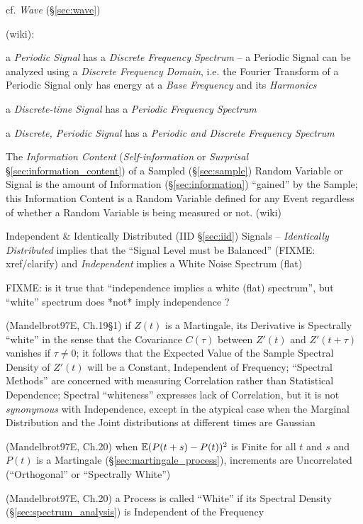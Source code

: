 cf. \emph{Wave} (\S\ref{sec:wave})

(wiki):

a \emph{Periodic Signal} has a \emph{Discrete Frequency Spectrum} -- a Periodic
Signal can be analyzed using a \emph{Discrete Frequency Domain}, i.e. the
Fourier Transform of a Periodic Signal only has energy at a \emph{Base
  Frequency} and its \emph{Harmonics}

a \emph{Discrete-time Signal} has a \emph{Periodic Frequency Spectrum}

a \emph{Discrete, Periodic Signal} has a \emph{Periodic and Discrete Frequency
  Spectrum}

The \emph{Information Content} (\emph{Self-information} or \emph{Surprisal}
\S\ref{sec:information_content}) of a Sampled (\S\ref{sec:sample}) Random
Variable or Signal is the amount of Information (\S\ref{sec:information})
``gained'' by the Sample; this Information Content is a Random Variable defined
for any Event regardless of whether a Random Variable is being measured or not.
(wiki)

Independent \& Identically Distributed (IID \S\ref{sec:iid}) Signals --
\emph{Identically Distributed} implies that the ``Signal Level must be
Balanced'' (FIXME: xref/clarify) and \emph{Independent} implies a White Noise
Spectrum (flat)

FIXME: is it true that ``independence implies a white (flat) spectrum'',
but ``white'' spectrum does *not* imply independence ?

(Mandelbrot97E, Ch.19\S 1) if $Z(t)$ is a Martingale, its Derivative is
Spectrally ``white'' in the sense that the Covariance $C(\tau)$ between $Z'(t)$
and $Z'(t + \tau)$ vanishes if $\tau \neq 0$; it follows that the Expected Value
of the Sample Spectral Density of $Z'(t)$ will be a Constant, Independent of
Frequency; ``Spectral Methods'' are concerned with measuring Correlation rather
than Statistical Dependence; Spectral ``whiteness'' expresses lack of
Correlation, but it is not \emph{synonymous} with Independence, except in the
atypical case when the Marginal Distribution and the Joint distributions at
different times are Gaussian

(Mandelbrot97E, Ch.20) when $\mathbb{E}(P(t+s) - P(t))^2$ is Finite for all $t$ and
$s$ and $P(t)$ is a Martingale (\S\ref{sec:martingale_process}), increments are
Uncorrelated (``Orthogonal'' or ``Spectrally White'')

(Mandelbrot97E, Ch.20) a Process is called ``White'' if its Spectral Density
(\S\ref{sec:spectrum_analysis}) is Independent of the Frequency



